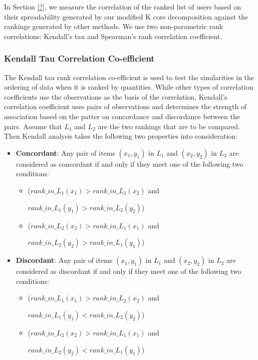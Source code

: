 \documentclass[sigconf]{acmart}
\begin{document}

In Section \ref{?}, we measure the correlation of the ranked list of users based on their spreadability generated by our modified K core decomposition against the rankings generated by other methods. We use two non-parametric rank correlations: Kendall’s tau and Spearman’s rank correlation coefficient.

\subsubsection{Kendall Tau Correlation Co-efficient}

The Kendall tau rank correlation co-efficient is used to test the similarities in the ordering of data when it is ranked by quantities. While other types of correlation coefficients use the observations as the basis of the correlation, Kendall’s correlation coefficient uses pairs of observations and determines the strength of association based on the patter on concordance and discordance between the pairs. Assume that $L_1$ and $L_2$ are the two rankings that are to be compared. Then Kendall analysis takes the following two properties into consideration:

\begin{itemize}
    \item \textbf{Concordant}: Any pair of items $(x_1,y_1)$ in $L_1$ and $(x_2,y_2)$ in $L_2$ are considered as concordant if and only if they meet one of the following two conditions:
    
    \begin{itemize}
        \item ($rank\_in\_L_1(x_1) > rank\_in\_L_2(x_2)$ and 
        
        $rank\_in\_L_1(y_1) > rank\_in\_L_2(y_2)$)
        
        \item ($rank\_in\_L_2(x_2) > rank\_in\_L_1(x_1)$ and 
        
        $rank\_in\_L_2(y_2) > rank\_in\_L_1(y_1)$)
    \end{itemize}
    
    \item \textbf{Discordant}: Any pair of items $(x_1,y_1)$ in $L_1$ and $(x_2,y_2)$ in $L_2$ are considered as discordant if and only if they meet one of the following two conditions:
    
    \begin{itemize}
        \item ($rank\_in\_L_1(x_1) > rank\_in\_L_2(x_2)$ and 
        
        $rank\_in\_L_1(y_1) < rank\_in\_L_2(y_2)$)
        
        \item ($rank\_in\_L_2(x_2) > rank\_in\_L_1(x_1)$ and 
        
        $rank\_in\_L_2(y_2) < rank\_in\_L_1(y_1)$)
    \end{itemize}
\end{itemize}
\end{document}
